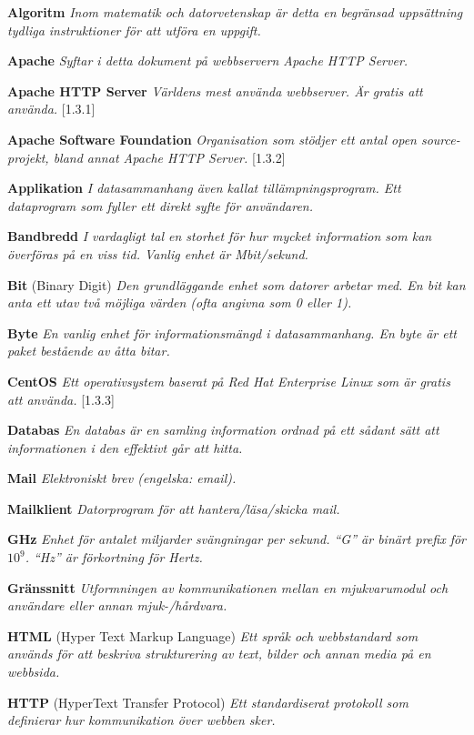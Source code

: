\documentclass[a4paper, twoside, 11pt, titlepage]{article}
\begin{document}
	\textbf{Algoritm} \emph{Inom matematik och datorvetenskap är detta en begränsad uppsättning tydliga instruktioner för att utföra en uppgift.}

	\textbf{Apache} \emph{Syftar i detta dokument på webbservern  Apache HTTP Server.}

	\textbf{Apache HTTP Server} \emph{Världens mest använda webbserver. Är gratis att använda.} [1.3.1]

	\textbf{Apache Software Foundation} \emph{Organisation som stödjer ett antal open source-projekt, bland annat Apache HTTP Server.} [1.3.2]

	\textbf{Applikation} \emph{I datasammanhang även kallat tillämpningsprogram. Ett dataprogram som fyller ett direkt syfte för användaren.}

	\textbf{Bandbredd} \emph{I vardagligt tal en storhet för hur mycket information som kan överföras på en viss tid. Vanlig enhet är Mbit/sekund.}

	\textbf{Bit} (Binary Digit) \emph{Den grundläggande enhet som datorer arbetar med. En bit kan anta ett utav två möjliga värden (ofta angivna som 0 eller 1).}

	\textbf{Byte} \emph{En vanlig enhet för informationsmängd i datasammanhang. En byte är ett paket bestående av åtta bitar.}

	\textbf{CentOS} \emph{Ett operativsystem baserat på Red Hat Enterprise Linux som är gratis att använda.} [1.3.3]

	\textbf{Databas} \emph{En databas är en samling information ordnad på ett sådant sätt att informationen i den effektivt går att hitta.}

	\textbf{Mail} \emph{Elektroniskt brev (engelska: email).}

	\textbf{Mailklient} \emph{Datorprogram för att hantera/läsa/skicka mail.}

	\textbf{GHz} \emph{Enhet för antalet miljarder svängningar per sekund. ``G'' är binärt prefix för $10^{9}$. ``Hz'' är förkortning för Hertz.}

	\textbf{Gränssnitt} \emph{Utformningen av kommunikationen mellan en mjukvarumodul och användare eller annan mjuk-/hårdvara.}

	\textbf{HTML} (Hyper Text Markup Language) \emph{Ett språk och webbstandard som används för att beskriva strukturering av text, bilder och annan media på en webbsida.}

	\textbf{HTTP} (HyperText Transfer Protocol) \emph{Ett standardiserat protokoll som definierar hur kommunikation över webben sker.}
\end{document}
